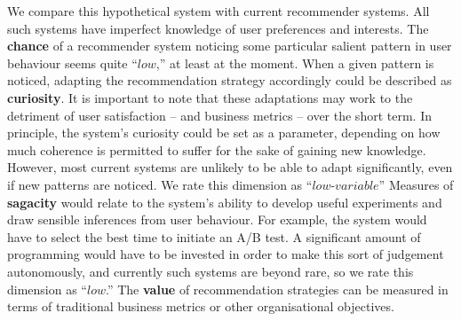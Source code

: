 We compare this hypothetical system with current recommender systems.
All such systems have imperfect knowledge of user preferences and
interests.  The \textbf{chance} of a recommender system noticing
some particular salient pattern in user behaviour
seems quite ``$\mathit{low}$,'' at least at the moment.
When a given pattern is noticed,
adapting the recommendation strategy accordingly could be described as
\textbf{curiosity}.  It is important to note that these adaptations
may work to the detriment of
user satisfaction -- and business metrics -- over the short term.  In
principle, the system's curiosity could be set as a parameter,
depending on how much coherence is permitted to suffer for the sake of
gaining new knowledge.  However, most current systems are unlikely to
be able to adapt significantly, even if new patterns are noticed.  We rate this dimension
as ``$\mathit{low}\text{-}\mathit{variable}$''  Measures of \textbf{sagacity} would relate to
the system's ability to develop useful experiments and draw sensible
inferences from user behaviour.  For example, the system would have to
select the best time to initiate an A/B test.  A significant amount of
programming would have to be invested in order to make this sort of
judgement autonomously, and currently such systems are beyond rare,
so we rate this dimension as ``$\mathit{low}$.''
The \textbf{value} of recommendation strategies can be measured in
terms of traditional business metrics or other organisational
objectives.






